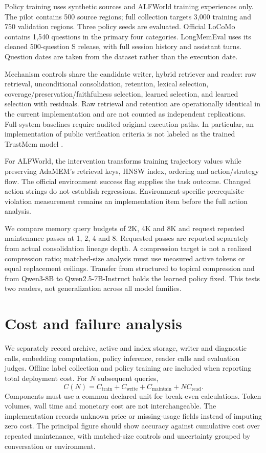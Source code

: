 \documentclass[11pt]{article}
\begin{document}
Policy training uses synthetic sources and ALFWorld training experiences only.
The pilot contains 500 source regions; full collection targets 3,000 training
and 750 validation regions. Three policy seeds are evaluated. Official LoCoMo
contains 1,540 questions in the primary four categories. LongMemEval uses its
cleaned 500-question S release, with full session history and assistant turns.
Question dates are taken from the dataset rather than the execution date.

Mechanism controls share the candidate writer, hybrid retriever and reader:
raw retrieval, unconditional consolidation, retention, lexical selection,
coverage/preservation/faithfulness selection, learned selection, and learned
selection with residuals. Raw retrieval and retention are operationally identical
in the current implementation and are not counted as independent replications.
Full-system baselines require audited original execution paths. In particular,
an implementation of public verification criteria is not labeled as the trained
TrustMem model \cite{trustmem}.

For ALFWorld, the intervention transforms training trajectory values while
preserving AdaMEM's retrieval keys, HNSW index, ordering and action/strategy flow.
The official environment success flag supplies the task outcome. Changed action
strings do not establish regressions. Environment-specific prerequisite-violation
measurement remains an implementation item before the full action analysis.

We compare memory query budgets of 2K, 4K and 8K and request repeated maintenance
passes at 1, 2, 4 and 8. Requested passes are reported separately from actual
consolidation lineage depth. A compression target is not a realized compression
ratio; matched-size analysis must use measured active tokens or equal replacement
ceilings. Transfer from structured to topical compression and from Qwen3-8B to
Qwen2.5-7B-Instruct holds the learned policy fixed. This tests two readers, not
generalization across all model families.

\section{Cost and failure analysis}
We separately record archive, active and index storage, writer and diagnostic
calls, embedding computation, policy inference, reader calls and evaluation
judges. Offline label collection and policy training are included when reporting
total deployment cost. For $N$ subsequent queries,
\begin{equation}
C(N)=C_{\mathrm{train}}+C_{\mathrm{write}}+C_{\mathrm{maintain}}+N C_{\mathrm{read}}.
\end{equation}
Components must use a common declared unit for break-even calculations. Token
volumes, wall time and monetary cost are not interchangeable. The implementation
records unknown price or missing-usage fields instead of imputing zero cost.
The principal figure should show accuracy against cumulative cost over repeated
maintenance, with matched-size controls and uncertainty grouped by conversation
or environment.
\end{document}
